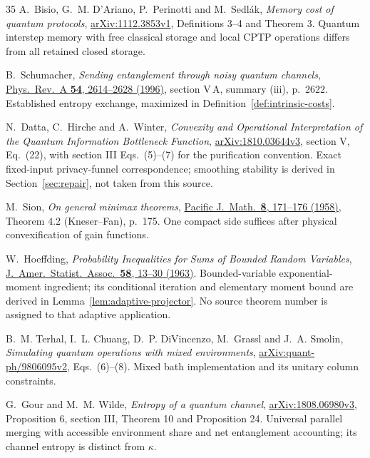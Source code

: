 \documentclass[11pt,a4paper]{article}
\numberwithin{equation}{section}
\theoremstyle{plain}
\theoremstyle{definition}
\begin{document}
\begin{thebibliography}{35}
A.~Bisio, G.~M. D'Ariano, P.~Perinotti and M.~Sedl\'ak, \emph{Memory cost of
quantum protocols},
\href{https://arxiv.org/pdf/1112.3853v1}{arXiv:1112.3853v1},
Definitions 3--4 and Theorem 3. Quantum interstep memory with free classical
storage and local CPTP operations differs from all retained closed storage.

B.~Schumacher, \emph{Sending entanglement through noisy quantum channels},
\href{https://doi.org/10.1103/PhysRevA.54.2614}{Phys.\
Rev.\ A \textbf{54}, 2614--2628 (1996)}, section V\,A, summary (iii), p.~2622.
Established entropy exchange, maximized in
Definition~\ref{def:intrinsic-costs}.

N.~Datta, C.~Hirche and A.~Winter, \emph{Convexity and Operational
Interpretation of the Quantum Information Bottleneck Function},
\href{https://arxiv.org/html/1810.03644v3}{arXiv:1810.03644v3}, section V,
Eq.~(22), with section III Eqs.~(5)--(7) for the purification convention.
Exact fixed-input privacy-funnel correspondence; smoothing stability is
derived in Section~\ref{sec:repair}, not taken from this source.

M.~Sion, \emph{On general minimax theorems},
\href{https://msp.org/pjm/1958/8-1/pjm-v8-n1-p14-p.pdf}{Pacific J.\ Math.\
\textbf{8}, 171--176 (1958)}, Theorem 4.2 (Kneser--Fan), p.~175. One compact
side suffices after physical convexification of gain functions.

\bibitem{Hoeffding1963}
W.~Hoeffding, \emph{Probability Inequalities for Sums of Bounded Random
Variables}, \href{https://doi.org/10.1080/01621459.1963.10500830}{J.\ Amer.\
Statist.\ Assoc.\ \textbf{58}, 13--30 (1963)}. Bounded-variable
exponential-moment ingredient; its conditional iteration and elementary moment
bound are derived in Lemma~\ref{lem:adaptive-projector}. No source theorem
number is assigned to that adaptive application.

\bibitem{Terhal1998}
B.~M. Terhal, I.~L. Chuang, D.~P. DiVincenzo, M.~Grassl and J.~A. Smolin,
\emph{Simulating quantum operations with mixed environments},
\href{https://arxiv.org/pdf/quant-ph/9806095v2}{arXiv:quant-ph/9806095v2},
Eqs.~(6)--(8). Mixed bath implementation and its unitary column constraints.

\bibitem{GourWilde2021}
G.~Gour and M.~M. Wilde, \emph{Entropy of a quantum channel},
\href{https://arxiv.org/html/1808.06980v3}{arXiv:1808.06980v3},
Proposition 6, section III, Theorem 10 and Proposition 24. Universal parallel
merging with accessible environment share and net entanglement accounting; its
channel entropy is distinct from $\kappa$.


\end{thebibliography}
\end{document}
